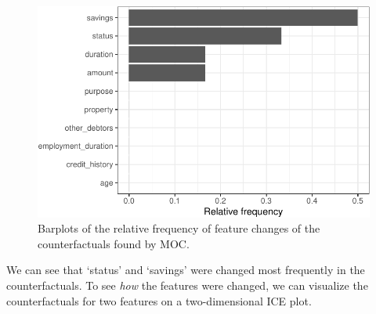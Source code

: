 \begin{figure}[H]

{\centering \includegraphics[width=1\textwidth,height=\textheight]{chapters/chapter12/model_interpretation_files/figure-pdf/fig-cf-mocfreq-1.pdf}

}

\caption{\label{fig-cf-mocfreq}Barplots of the relative frequency of
feature changes of the counterfactuals found by MOC.}

\end{figure}

We can see that `status' and `savings' were changed most frequently in
the counterfactuals. To see \emph{how} the features were changed, we can
visualize the counterfactuals for two features on a two-dimensional ICE
plot.

\begin{Shaded}
\begin{Highlighting}[]
\SpecialCharTok{$}\NormalTok{(} \NormalTok{(}\NormalTok{, }\NormalTok{)) }\SpecialCharTok{+}
    \NormalTok{(} \NormalTok{(} \NormalTok{, }\NormalTok{))}
\end{Highlighting}
\end{Shaded}

